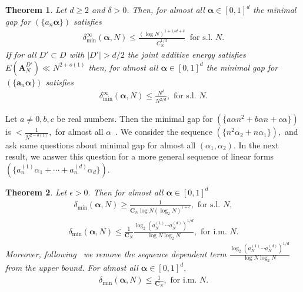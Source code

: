 \documentclass[12pt,article]{amsart}
\newtheorem{theorem}{Theorem}[section]
\theoremstyle{remark}
\numberwithin{equation}{section}
\newcommand{\bolda}{\boldsymbol{a}}
\newcommand{\boldA}{\boldsymbol{A}}
\newcommand{\boldCN}{\boldsymbol{C}_N}
\newcommand{\boldalpha}{\boldsymbol{\alpha}}
\begin{document}
	\begin{theorem}\label{theorem2}
		Let $d\geq 2$ and $\delta>0$. Then,
		for almost all $\boldalpha\in[0,1]^d$ the minimal gap for $(\{a_n\boldalpha\})$ satisfies
		\begin{align*} %
			\delta_{\text{min}}^\infty(\boldalpha,N)\leq \frac{(\log N)^{1+1/d+\delta}}{C_N^{1/d}}\: \text{ for s.l. }N.
		\end{align*}
		If for all $D'\subset D$ with $|D'|>d/2$ the joint additive energy satisfies $E(\boldA_N^{D'})\ll N^{2+o(1)}$ then, for almost all $\boldalpha\in[0,1]^d$ the minimal gap for $(\{\bolda_n\boldalpha\})$ satisfies
		\begin{align*} %
			\delta_{\text{min}}^\infty(\boldalpha,N)\leq \frac{N^\delta}{N^{2/d}}, \text{  for s.l. }N.
		\end{align*}
	\end{theorem}
	Let $a\neq 0, b,c$ be real numbers. Then the minimal gap for $(\{a\alpha n^2+b\alpha n+c\alpha\})$ is $<\frac{1}{N^{2-o(1)}},$ for almost all $\alpha$~\cite[Theorem 1.8]{shvoreghvim2021}.
	We consider the sequence $(\{n^2\alpha_2+n\alpha_1\}),$ and ask same questions about minimal gap for almost all $(\alpha_1,\alpha_2).$
	In the next result, we answer this question for a more general sequence of linear forms $(\{a_n^{(1)}\alpha_1+\cdots+a_n^{(d)}\alpha_d\}).$
	\begin{theorem}\label{thm3}
		Let $\epsilon>0.$ Then for almost all $\boldalpha\in[0,1]^d$ 
		\begin{align*} %
			\delta_{\text{min}}(\boldalpha,N)\geq \frac{1}{\boldCN\log N(\log_2 N)^{1+\epsilon}}, \text{ for s.l. }N,
		\end{align*}
		\begin{align*} %
			\delta_{\text{min}}(\boldalpha,N)\leq\frac{1}{\boldCN}\frac{\log_2\left(a_N^{(1)}\cdots a_N^{(d)}\right)^{1/d}}{\log N\log_2 N}, \text{ for i.m. }N.
		\end{align*}
		Moreover, following~\cite{Aistleitner2021minimalgap} we remove the sequence dependent term $\frac{\log_2\left(a_N^{(1)}\cdots a_N^{(d)}\right)^{1/d}}{\log N\log_2 N}$ from the upper bound. For almost all $\boldalpha\in[0,1]^d,$
		\begin{align*} %
			\delta_{\text{min}}(\boldalpha,N)\leq\frac{1}{\boldCN}, \text{ for i.m. }N.
		\end{align*}
	\end{theorem}
	
\end{document}

